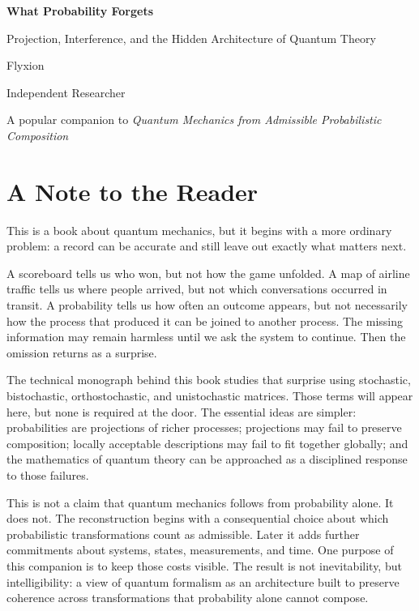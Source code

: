 \documentclass[12pt,openany]{book}
\begin{document}
\frontmatter
\begin{titlepage}
\centering
\vspace*{1.1in}
{\Huge\bfseries\color{inkblue} What Probability Forgets\par}
\vspace{0.3in}
{\Large Projection, Interference, and the Hidden Architecture of Quantum Theory\par}
\vfill
{\large Flyxion\par}
\vspace{0.08in}
{\small Independent Researcher\par}
\vspace{0.6in}
{\small A popular companion to \emph{Quantum Mechanics from Admissible Probabilistic Composition}\par}
\end{titlepage}

\chapter*{A Note to the Reader}
This is a book about quantum mechanics, but it begins with a more ordinary problem: a record can be accurate and still leave out exactly what matters next.

A scoreboard tells us who won, but not how the game unfolded. A map of airline traffic tells us where people arrived, but not which conversations occurred in transit. A probability tells us how often an outcome appears, but not necessarily how the process that produced it can be joined to another process. The missing information may remain harmless until we ask the system to continue. Then the omission returns as a surprise.

The technical monograph behind this book studies that surprise using stochastic, bistochastic, orthostochastic, and unistochastic matrices. Those terms will appear here, but none is required at the door. The essential ideas are simpler: probabilities are projections of richer processes; projections may fail to preserve composition; locally acceptable descriptions may fail to fit together globally; and the mathematics of quantum theory can be approached as a disciplined response to those failures.

This is not a claim that quantum mechanics follows from probability alone. It does not. The reconstruction begins with a consequential choice about which probabilistic transformations count as admissible. Later it adds further commitments about systems, states, measurements, and time. One purpose of this companion is to keep those costs visible. The result is not inevitability, but intelligibility: a view of quantum formalism as an architecture built to preserve coherence across transformations that probability alone cannot compose.
\end{document}
